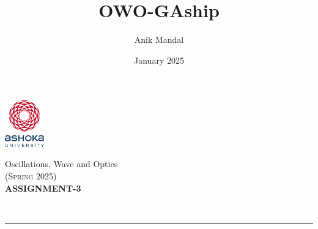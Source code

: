\documentclass[12pt, a4paper]{article}
\title{OWO-GAship}
\author{Anik Mandal}
\date{January 2025}
\begin{document}
\begin{minipage}[t][][c]{0.1\textwidth}
    \begin{flushleft}
        \includegraphics[height=2cm]{tex-resources/Ashoka Logo.png}
    \end{flushleft}
\end{minipage}
\begin{minipage}[t][][c]{0.85\textwidth}
    \begin{center}
        {\LARGE Oscillations, Wave and Optics}\\ \vspace{0.5em}
        \textsc{(Spring 2025)}\\
        \vspace{1em}
        \textbf{\Large ASSIGNMENT-3} \\
    \end{center}
\end{minipage}
\vspace{10pt}\\
\rule[0em]{\textwidth}{0.75pt}
\end{document}
